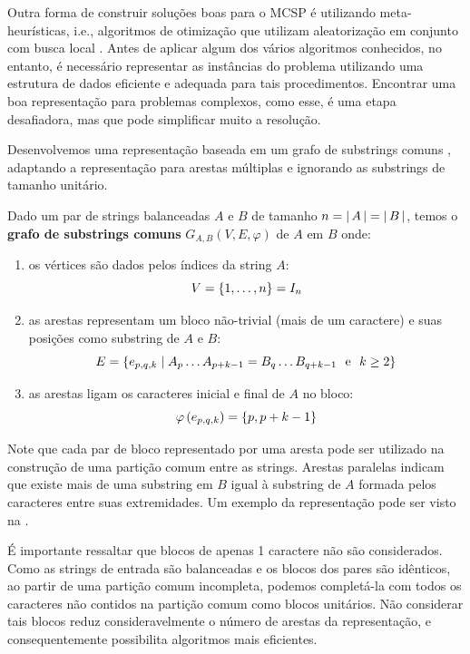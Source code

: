 Outra forma de construir soluções boas para o MCSP é utilizando meta-heurísticas, i.e., algoritmos de otimização que utilizam aleatorização em conjunto com busca local \cite[p.~4]{yang_nature-inspired_2010}. Antes de aplicar algum dos vários algoritmos conhecidos, no entanto, é necessário representar as instâncias do problema utilizando uma estrutura de dados eficiente e adequada para tais procedimentos. Encontrar uma boa representação para problemas complexos, como esse, é uma etapa desafiadora, mas que pode simplificar muito a resolução.

Desenvolvemos uma representação baseada em um grafo de substrings comuns \cite{ferdous_solving_2013}, adaptando a representação para arestas múltiplas e ignorando as substrings de tamanho unitário.

\begin{definition}
    Dado um par de strings balanceadas $A$ e $B$ de tamanho $n = {\left\lvert\,A\,\right\rvert} = {\left\lvert\,B\,\right\rvert}$, temos o \textbf{grafo de substrings comuns} $G_{A,B}(V,E,\varphi)$ de $A$ em $B$ onde:
    
    \begin{enumerate}[
        label = {\alph*)},
        ref = \thedefinition.\alph*,
        parsep = 0pt,
        itemsep = 0.2em,
        topsep = 0pt
    ]
        \item os vértices são dados pelos índices da string $A$: \[
            V = \set{1, \ldots, n} = I_n
        \]

        \item as arestas representam um bloco não-trivial (mais de um caractere) e suas posições como substring de $A$ e $B$: \[
            E = \set{e_{p, q, k} \mid A_p \ldots A_{p + k - 1} = B_q \ldots B_{q + k - 1} ~\text{ e }~ k \geq 2}
        \]

        \item as arestas ligam os caracteres inicial e final de $A$ no bloco: \[
            \varphi\left(e_{p, q, k}\right) = \set{p, p + k - 1}
        \]
    \end{enumerate}
\end{definition}

Note que cada par de bloco representado por uma aresta pode ser utilizado na construção de uma partição comum entre as strings. Arestas paralelas indicam que existe mais de uma substring em $B$ igual à substring de $A$ formada pelos caracteres entre suas extremidades. Um exemplo da representação pode ser visto na .

É importante ressaltar que blocos de apenas 1 caractere não são considerados. Como as strings de entrada são balanceadas e os blocos dos pares são idênticos, ao partir de uma partição comum incompleta, podemos completá-la com todos os caracteres não contidos na partição comum como blocos unitários. Não considerar tais blocos reduz consideravelmente o número de arestas da representação, e consequentemente possibilita algoritmos mais eficientes.

